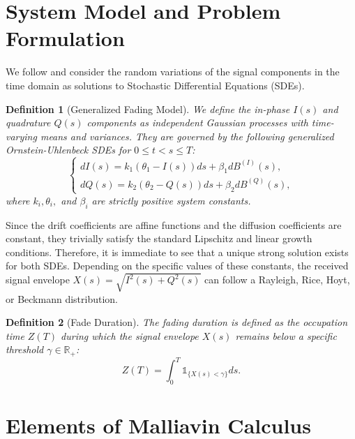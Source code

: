 \documentclass[11pt]{article}
\newtheorem{definition}{Definition}
\begin{document}
\section{System Model and Problem Formulation}\label{sec:preliminaries} 

We follow \citet{benamar2025stochastic} and consider the random variations of the signal components in the time domain as solutions to Stochastic Differential Equations (SDEs). 

\begin{definition}[Generalized Fading Model]
We define the in-phase $I(s)$ and quadrature $Q(s)$ components as independent Gaussian processes with time-varying means and variances. They are governed by the following generalized Ornstein-Uhlenbeck SDEs for $0 \leq t < s \leq T$:
\begin{equation}
\begin{cases}
    dI(s) = k_1(\theta_1 - I(s))ds + \beta_1 dB^{(I)}(s), \\
    dQ(s) = k_2(\theta_2 - Q(s))ds + \beta_2 dB^{(Q)}(s),
\end{cases}
\end{equation}
where $k_i, \theta_i,$ and $\beta_i$ are strictly positive system constants.
\end{definition}

Since the drift coefficients are affine functions and the diffusion coefficients are constant, they trivially satisfy the standard Lipschitz and linear growth conditions. Therefore, it is immediate to see that a unique strong solution exists for both SDEs. Depending on the specific values of these constants, the received signal envelope $X(s) = \sqrt{I^2(s) + Q^2(s)}$ can follow a Rayleigh, Rice, Hoyt, or Beckmann distribution.

\begin{definition}[Fade Duration]
The fading duration is defined as the occupation time $Z(T)$ during which the signal envelope $X(s)$ remains below a specific threshold $\gamma \in \mathbb{R}_{+}$:
\begin{equation}
    Z(T) = \int_{0}^{T} \mathds{1}_{\{X(s) < \gamma\}} ds.
\end{equation}
\end{definition}

\section{Elements of Malliavin Calculus}
\label{sec:malliavin_review}
\end{document}
